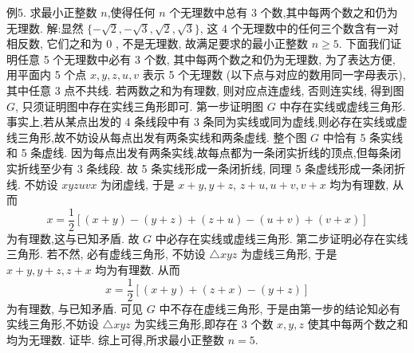 例5. 求最小正整数 $n$,使得任何 $n$ 个无理数中总有 3 个数,其中每两个数之和仍为无理数.
解:显然 $\{-\sqrt{2},-\sqrt{3}, \sqrt{2}, \sqrt{3}\}$, 这 4 个无理数中的任何三个数含有一对相反数, 它们之和为 0 , 不是无理数, 故满足要求的最小正整数 $n \geqslant 5$.
下面我们证明任意 5 个无理数中必有 3 个数, 其中每两个数之和仍为无理数, 为了表达方便, 用平面内 5 个点 $x, y, z, u, v$ 表示 5 个无理数 (以下点与对应的数用同一字母表示), 其中任意 3 点不共线.
若两数之和为有理数, 则对应点连虚线, 否则连实线, 得到图 $G$, 只须证明图中存在实线三角形即可.
第一步证明图 $G$ 中存在实线或虚线三角形.
事实上,若从某点出发的 4 条线段中有 3 条同为实线或同为虚线,则必存在实线或虚线三角形,故不妨设从每点出发有两条实线和两条虚线.
整个图 $G$ 中恰有 5 条实线和 5 条虚线.
因为每点出发有两条实线,故每点都为一条闭实折线的顶点,但每条闭实折线至少有 3 条线段.
故 5 条实线形成一条闭折线, 同理 5 条虚线形成一条闭折线.
不妨设 $x y z u v x$ 为闭虚线, 于是 $x+y, y+z$, $z+u, u+v, v+x$ 均为有理数, 从而
$$
x=\frac{1}{2}[(x+y)-(y+z)+(z+u)-(u+v)+(v+x)]
$$
为有理数,这与已知矛盾.
故 $G$ 中必存在实线或虚线三角形.
第二步证明必存在实线三角形.
若不然, 必有虚线三角形, 不妨设 $\triangle x y z$ 为虚线三角形, 于是 $x+y, y+z, z+x$ 均为有理数.
从而
$$
x=\frac{1}{2}[(x+y)+(z+x)-(y+z)]
$$
为有理数, 与已知矛盾.
可见 $G$ 中不存在虚线三角形, 于是由第一步的结论知必有实线三角形,不妨设 $\triangle x y z$ 为实线三角形,即存在 3 个数 $x, y, z$ 使其中每两个数之和均为无理数.
证毕.
综上可得,所求最小正整数 $n=5$.



